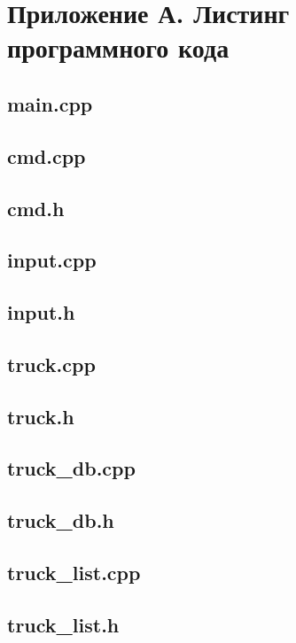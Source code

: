 \section*{Приложение А. Листинг программного кода}

\subsection*{main.cpp}

\newpage

\subsection*{cmd.cpp}

\newpage

\subsection*{cmd.h}

\newpage

\subsection*{input.cpp}

\newpage

\subsection*{input.h}

\newpage

\subsection*{truck.cpp}

\newpage

\subsection*{truck.h}

\newpage

\subsection*{truck\_db.cpp}

\newpage

\subsection*{truck\_db.h}

\newpage

\subsection*{truck\_list.cpp}

\newpage

\subsection*{truck\_list.h}

\newpage